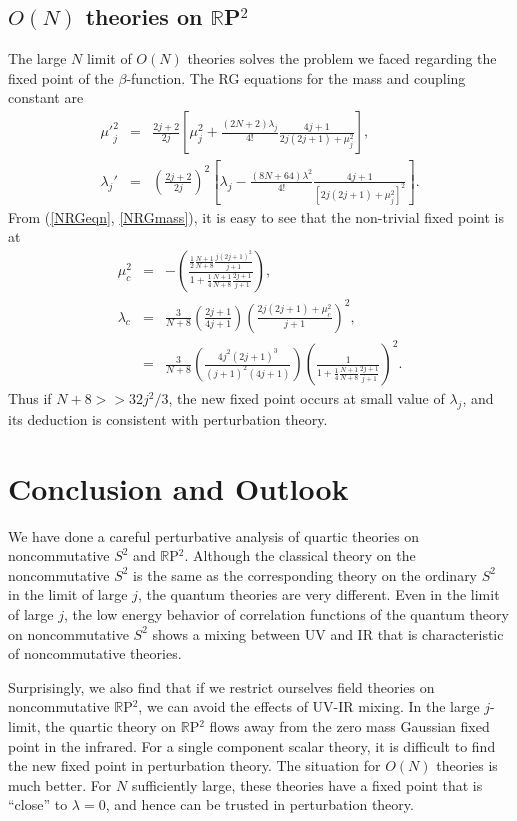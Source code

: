 \documentclass[a4paper,12pt]{article}
\numberwithin{equation}{section}
\begin{document}
\subsection{$O(N)$ theories on ${\mathbb R}$P$^2$} 
The large $N$ limit of $O(N)$ theories solves the problem we faced
regarding the fixed point of the $\beta$-function. The RG equations
for the mass and coupling constant are
\begin{eqnarray}
{\mu'}_j^2 &=& \frac{2j+2}{2j}\left[\mu_j^2 + \frac{(2N+2)\lambda_j}{4!}
\frac{4j+1}{2j(2j+1) + \mu_j^2} \right], \label{NRGmass} \\
\lambda_j' &=& \left(\frac{2j +2}{2j}\right)^2 \left[\lambda_j -
\frac{(8N+64)\lambda^2}{4!} \frac{4j+1}{[2j(2j+1)+\mu_j^2]^2}\right]. 
\label{NRGeqn}
\end{eqnarray}  
From (\ref{NRGeqn}, \ref{NRGmass}), it is easy to see that the
non-trivial fixed point is at
\begin{eqnarray}
\mu_c^2 &=& - \left(\frac{\frac{1}{2} \frac{N+1}{N+8} \frac{j(2j+1)^2}{j+1}}{1
+ \frac{1}{4} \frac{N+1}{N+8} \frac{2j+1}{j+1}}\right),  \\
\lambda_c &=& \frac{3}{N+8} \left(\frac{2j+1}{4j+1}\right)
\left(\frac{2j(2j+1) + \mu^2_c}{j+1}\right)^2, \\
&=& \frac{3}{N+8} \left(\frac{4j^2(2j+1)^3}{(j+1)^2 (4j+1)}\right)
\left(\frac{1}{1 + \frac{1}{4} \frac{N+1}{N+8}
\frac{2j+1}{j+1}} \right)^2. 
\end{eqnarray}   
Thus if
$N+8>>32j^2 /3$, the new fixed point occurs at small value of $\lambda_j$,
and its deduction is consistent with perturbation theory.

\section{Conclusion and Outlook}

We have done a careful perturbative analysis of quartic theories on
noncommutative $S^2$ and ${\mathbb R}$P$^2$. Although the classical
theory on the noncommutative $S^2$ is the same as the corresponding
theory on the ordinary $S^2$ in the limit of large $j$, the quantum
theories are very different. Even in the limit of large $j$, the low
energy behavior of correlation functions of the quantum theory on
noncommutative $S^2$ shows a mixing between UV and IR that is
characteristic of noncommutative theories.

Surprisingly, we also find that if we restrict ourselves field
theories on noncommutative ${\mathbb R}$P$^2$, we can avoid the
effects of UV-IR mixing. In the large $j$-limit, the quartic theory on
${\mathbb R}$P$^2$ flows away from the zero mass Gaussian fixed point
in the infrared. For a single component scalar theory, it is difficult
to find the new fixed point in perturbation theory. The situation for
$O(N)$ theories is much better. For $N$ sufficiently large, these
theories have a fixed point that is ``close'' to $\lambda=0$, and
hence can be trusted in perturbation theory.
\end{document}
